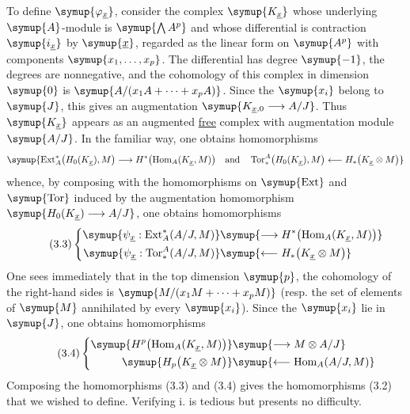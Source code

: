 To define $\symup{\varphi_{\underline{x}}}$, consider the complex
$\symup{K_{\underline{x}}}$ whose underlying $\symup{A}$-module is $\symup{\bigwedge A^{p}}$ and whose
differential is contraction $\symup{i_{\underline{x}}}$ by $\symup{\underline{x}}$, regarded
as the linear form on $\symup{A^{p}}$ with components $\symup{x_1,\ldots,x_p}$. The differential
has degree $\symup{-1}$, the degrees are nonnegative, and the cohomology of this complex
in dimension $\symup{0}$ is $\symup{A/(x_1A+\cdots+x_pA)}$. Since the $\symup{x_i}$ belong to $\symup{J}$, this
gives an augmentation $\symup{K_{\underline{x},0}\longrightarrow A/J}$. Thus
$\symup{K_{\underline{x}}}$ appears as an augmented \uline{free} complex with augmentation
module $\symup{A/J}$. In the familiar way, one obtains homomorphisms
\[
\symup{\operatorname{Ext}_{A}^{*}\bigl(H_0(K_{\underline{x}}),M\bigr)
\longrightarrow
H^{*}\bigl(\operatorname{Hom}_{A}(K_{\underline{x}},M)\bigr)\quad\text{and}\quad
\operatorname{Tor}_{*}^{A}\bigl(H_0(K_{\underline{x}}),M\bigr)
\longleftarrow
H_{*}\bigl(K_{\underline{x}}\otimes M\bigr)}
\]
whence, by composing with the homomorphisms on $\symup{\operatorname{Ext}}$ and
$\symup{\operatorname{Tor}}$ induced by the augmentation homomorphism
$\symup{H_0(K_{\underline{x}})\longrightarrow A/J}$, one obtains homomorphisms
\begin{equation}\tag{3.3}
\left\{
\begin{aligned}\symup{\psi_{\underline{x}}:
\operatorname{Ext}_{A}^{*}(A/J,M)}&\symup{\longrightarrow H^{*}\bigl(\operatorname{Hom}_{A}(K_{\underline{x}},M)\bigr)}\\\symup{\psi_{\underline{x}}:
\operatorname{Tor}_{*}^{A}(A/J,M)}&\symup{\longleftarrow H_{*}\bigl(K_{\underline{x}}\otimes M\bigr)}\end{aligned}
\right.
\end{equation}
One sees immediately that in the top dimension $\symup{p}$, the cohomology of the
right-hand sides is $\symup{M/(x_1M+\cdots+x_pM)}$ (resp. the set of elements of
$\symup{M}$ annihilated by every $\symup{x_i}$). Since the $\symup{x_i}$ lie in $\symup{J}$, one obtains
homomorphisms
\begin{equation}\tag{3.4}
\left\{
\begin{aligned}\symup{H^{p}\bigl(\operatorname{Hom}_{A}(K_{\underline{x}},M)\bigr)}&\symup{\longrightarrow M\otimes A/J}\\\symup{H_{p}\bigl(K_{\underline{x}}\otimes M\bigr)}&\symup{\longleftarrow\operatorname{Hom}_{A}(A/J,M)}\end{aligned}
\right.
\end{equation}
Composing the homomorphisms (3.3) and (3.4) gives the homomorphisms (3.2) that we
wished to define. Verifying i. is tedious but presents no difficulty.

